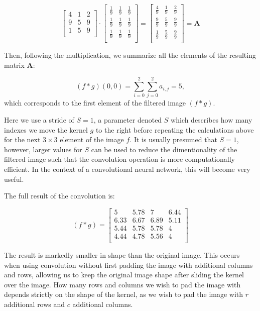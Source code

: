 \documentclass[%
oneside,                 %
final,                   %
10pt]{article}
\begin{document}
\[
\begin{bmatrix}
4 & 1 & 2 \\
9 & 5 & 9 \\
1 & 5 & 9 \\
\end{bmatrix}
\cdot
\begin{bmatrix}
\frac{1}{9} & \frac{1}{9} & \frac{1}{9} \\
\frac{1}{9} & \frac{1}{9} & \frac{1}{9} \\
\frac{1}{9} & \frac{1}{9} & \frac{1}{9} \\
\end{bmatrix}
=
\begin{bmatrix}
\frac{4}{9} & \frac{1}{9} & \frac{2}{9} \\
\frac{9}{9} & \frac{5}{9} & \frac{9}{9} \\
\frac{1}{9} & \frac{5}{9} & \frac{9}{9} \\
\end {bmatrix}
= \bm{A}
\]

Then, following the multiplication, we summarize all the elements of the resulting matrix $\bm{A}$:

\[
(f \ast g)(0, 0)= \sum_{i=0}^{2} \sum_{j=0}^{2} a_{i,j} = 5,
\]
which corresponds to the first element of the filtered image $(f \ast g)$.

Here we use a stride of $S=1$, a parameter denoted $S$ which describes how
many indexes we move the kernel $g$ to the right before repeating the
calculations above for the next $3 \times 3$ element of the image
$f$. It is usually presumed that $S=1$, however, larger values for $S$
can be used to reduce the dimentionality of the filtered image such
that the convolution operation is more computationally efficient. In
the context of a convolutional neural network, this will become very
useful.

The full result of the convolution is:

\[
(f \ast g) =
\begin{bmatrix}
5 & 5.78 & 7 & 6.44 \\
6.33 & 6.67 & 6.89 & 5.11 \\
5.44 & 5.78 & 5.78 & 4 \\
4.44 & 4.78 & 5.56 & 4 \\
\end{bmatrix}
\]

The result is markedly smaller in shape than the original image. This
occurs when using convolution without first padding the image with
additional columns and rows, allowing us to keep the original image
shape after sliding the kernel over the image.  How many rows and
columns we wish to pad the image with depends strictly on the shape of
the kernel, as we wish to pad the image with $r$ additional rows and
$c$ additional columns.
\end{document}
